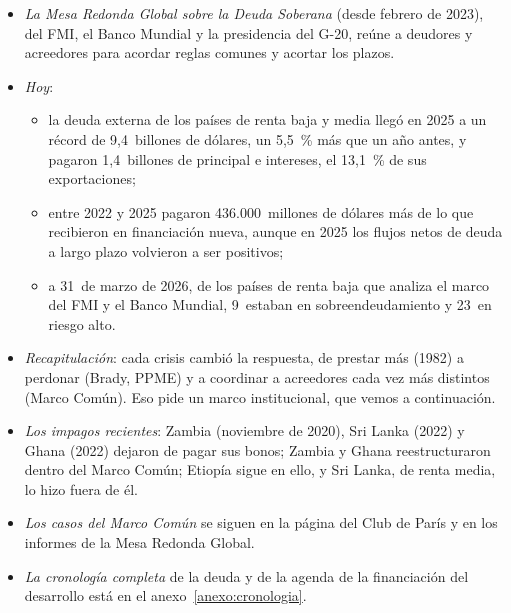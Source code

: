 \documentclass[11pt]{article}
\begin{document}
\begin{itemize}
\begin{itemize}
  \end{itemize}
\item \emph{La Mesa Redonda Global sobre la Deuda Soberana} (desde febrero de 2023), del FMI, el Banco Mundial y la presidencia del G-20, reúne a deudores y acreedores para acordar reglas comunes y acortar los plazos\nocite{FMI2023GSDR}.
\item \emph{Hoy}:
  \begin{itemize}
  \item la deuda externa de los países de renta baja y media llegó en 2025 a un récord de 9,4~billones de dólares, un 5,5~\% más que un año antes, y pagaron 1,4~billones de principal e intereses, el 13,1~\% de sus exportaciones\nocite{BancoMundial2026IDR,BancoMundial2026IDS};
  \item entre 2022 y 2025 pagaron 436.000~millones de dólares más de lo que recibieron en financiación nueva, aunque en 2025 los flujos netos de deuda a largo plazo volvieron a ser positivos\nocite{BancoMundial2026IDR};
  \item a 31~de marzo de 2026, de los países de renta baja que analiza el marco del FMI y el Banco Mundial, 9~estaban en sobreendeudamiento y 23~en riesgo alto\nocite{FMI2026ListaDSA}.
  \end{itemize}
\item \emph{Recapitulación}: cada crisis cambió la respuesta, de prestar más (1982) a perdonar (Brady, PPME) y a coordinar a acreedores cada vez más distintos (Marco Común). Eso pide un marco institucional, que vemos a continuación.
\end{itemize}

\begin{anotaciones}
\begin{itemize}
\item \emph{Los impagos recientes}: Zambia (noviembre de 2020), Sri Lanka (2022) y Ghana (2022) dejaron de pagar sus bonos; Zambia y Ghana reestructuraron dentro del Marco Común; Etiopía sigue en ello, y Sri Lanka, de renta media, lo hizo fuera de él\nocite{Francia2026MarcoComun,FMI2026ListaDSA}.
\item \emph{Los casos del Marco Común} se siguen en la página del Club de París\nocite{Francia2026MarcoComun} y en los informes de la Mesa Redonda Global.
\item \emph{La cronología completa} de la deuda y de la agenda de la financiación del desarrollo está en el anexo~\ref{anexo:cronologia}.
\end{itemize}
\end{anotaciones}
\end{document}
